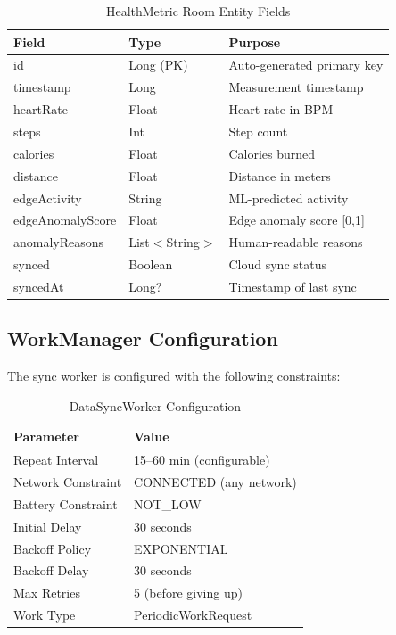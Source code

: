 \documentclass[conference]{IEEEtran}
\begin{document}
\begin{table}[H]
\centering
\caption{HealthMetric Room Entity Fields}
\label{tab:schema}
\begin{tabular}{lll}
\toprule
\textbf{Field} & \textbf{Type} & \textbf{Purpose} \\
\midrule
id & Long (PK) & Auto-generated primary key \\
timestamp & Long & Measurement timestamp \\
heartRate & Float & Heart rate in BPM \\
steps & Int & Step count \\
calories & Float & Calories burned \\
distance & Float & Distance in meters \\
edgeActivity & String & ML-predicted activity \\
edgeAnomalyScore & Float & Edge anomaly score [0,1] \\
anomalyReasons & List$<$String$>$ & Human-readable reasons \\
synced & Boolean & Cloud sync status \\
syncedAt & Long? & Timestamp of last sync \\
\bottomrule
\end{tabular}
\end{table}

\subsection{WorkManager Configuration}
The sync worker is configured with the following constraints:

\begin{table}[H]
\centering
\caption{DataSyncWorker Configuration}
\label{tab:worker_config}
\begin{tabular}{ll}
\toprule
\textbf{Parameter} & \textbf{Value} \\
\midrule
Repeat Interval & 15--60 min (configurable) \\
Network Constraint & CONNECTED (any network) \\
Battery Constraint & NOT\_LOW \\
Initial Delay & 30 seconds \\
Backoff Policy & EXPONENTIAL \\
Backoff Delay & 30 seconds \\
Max Retries & 5 (before giving up) \\
Work Type & PeriodicWorkRequest \\
\bottomrule
\end{tabular}
\end{table}
\end{document}
